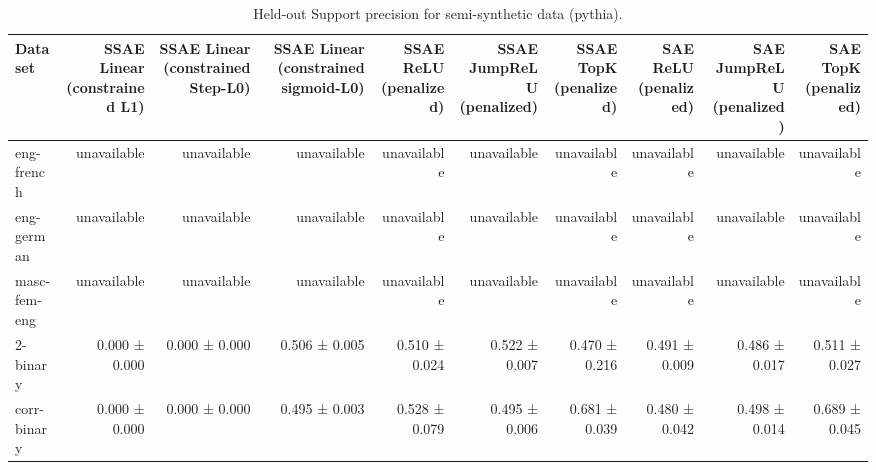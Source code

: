 \begin{table}[t]
\centering
\caption{Held-out Support precision for semi-synthetic data (pythia).}
\label{tab:semisynthetic-pythia-support-precision}
\begin{tabular}{lrrrrrrrrr}
\toprule
Dataset & SSAE Linear (constrained L1) & SSAE Linear (constrained Step-L0) & SSAE Linear (constrained sigmoid-L0) & SSAE ReLU (penalized) & SSAE JumpReLU (penalized) & SSAE TopK (penalized) & SAE ReLU (penalized) & SAE JumpReLU (penalized) & SAE TopK (penalized) \\
\midrule
eng-french & unavailable & unavailable & unavailable & unavailable & unavailable & unavailable & unavailable & unavailable & unavailable \\
eng-german & unavailable & unavailable & unavailable & unavailable & unavailable & unavailable & unavailable & unavailable & unavailable \\
masc-fem-eng & unavailable & unavailable & unavailable & unavailable & unavailable & unavailable & unavailable & unavailable & unavailable \\
2-binary & 0.000 ± 0.000 & 0.000 ± 0.000 & 0.506 ± 0.005 & 0.510 ± 0.024 & 0.522 ± 0.007 & 0.470 ± 0.216 & 0.491 ± 0.009 & 0.486 ± 0.017 & 0.511 ± 0.027 \\
corr-binary & 0.000 ± 0.000 & 0.000 ± 0.000 & 0.495 ± 0.003 & 0.528 ± 0.079 & 0.495 ± 0.006 & 0.681 ± 0.039 & 0.480 ± 0.042 & 0.498 ± 0.014 & 0.689 ± 0.045 \\
\bottomrule
\end{tabular}
\end{table}
